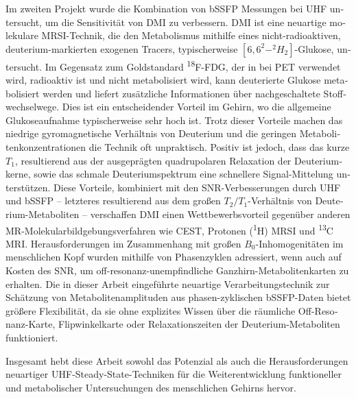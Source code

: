 \begin{otherlanguage}{german}
	Im zweiten Projekt wurde die Kombination von \gls{bSSFP} Messungen bei \gls{UHF} untersucht, um die Sensitivität von \gls{DMI} zu verbessern. \Gls{DMI} ist eine neuartige molekulare \gls{MRSI}-Technik, die den Metabolismus mithilfe eines nicht-radioaktiven, deuterium-markierten exogenen Tracers, typischerweise $[6,6^2-^2H_2]$-Glukose, untersucht. Im Gegensatz zum Goldstandard \textsuperscript{18}F-FDG, der in bei \gls{PET} verwendet wird, radioaktiv ist und nicht metabolisiert wird, kann deuterierte Glukose metabolisiert werden und liefert zusätzliche Informationen über nachgeschaltete Stoffwechselwege. Dies ist ein entscheidender Vorteil im Gehirn, wo die allgemeine Glukoseaufnahme typischerweise sehr hoch ist. Trotz dieser Vorteile machen das niedrige gyromagnetische Verhältnis von Deuterium und die geringen Metabolitenkonzentrationen die Technik oft unpraktisch. Positiv ist jedoch, dass das kurze $T_1$, resultierend aus der ausgeprägten quadrupolaren Relaxation der Deuteriumkerne, sowie das schmale Deuteriumspektrum eine schnellere Signal-Mittelung unterstützen. Diese Vorteile, kombiniert mit den \gls{SNR}-Verbesserungen durch \gls{UHF} und \gls{bSSFP} – letzteres resultierend aus dem großen $T_2/T_1$-Verhältnis von Deuterium-Metaboliten – verschaffen \gls{DMI} einen Wettbewerbsvorteil gegenüber anderen MR-Molekularbildgebungsverfahren wie \gls{CEST}, Protonen (\textsuperscript{1}H) \gls{MRSI} und \textsuperscript{13}C MRI. Herausforderungen im Zusammenhang mit großen $B_0$-Inhomogenitäten im menschlichen Kopf wurden mithilfe von Phasenzyklen adressiert, wenn auch auf Kosten des SNR, um off-resonanz-unempfindliche Ganzhirn-Metabolitenkarten zu erhalten. Die in dieser Arbeit eingeführte neuartige Verarbeitungstechnik zur Schätzung von Metabolitenamplituden aus phasen-zyklischen \gls{bSSFP}-Daten bietet größere Flexibilität, da sie ohne explizites Wissen über die räumliche Off-Resonanz-Karte, Flipwinkelkarte oder Relaxationszeiten der Deuterium-Metaboliten funktioniert.
	
	Insgesamt hebt diese Arbeit sowohl das Potenzial als auch die Herausforderungen neuartiger \gls{UHF}-Steady-State-Techniken für die Weiterentwicklung funktioneller und metabolischer Untersuchungen des menschlichen Gehirns hervor.
	
\end{otherlanguage}


